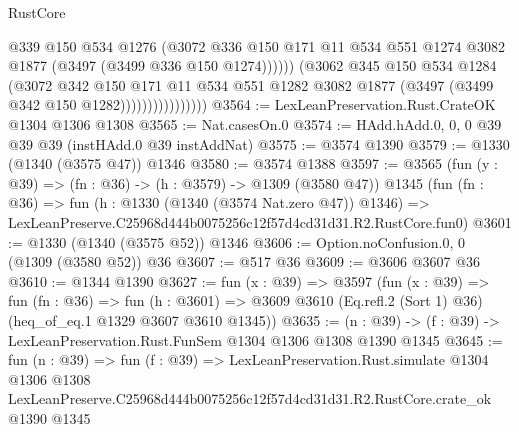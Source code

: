 \begin{lexlean}{RustCore}
\begin{coremodule}
                                  @339
                                  @150
                                  @534
                                  @1276
                                  (@3072
                                    @336
                                    @150
                                    @171
                                    @11
                                    @534
                                    @551
                                    @1274
                                    @3082
                                    @1877
                                    (@3497 (@3499 @336 @150 @1274))))))
                            (@3062
                              @345
                              @150
                              @534
                              @1284
                              (@3072
                                @342
                                @150
                                @171
                                @11
                                @534
                                @551
                                @1282
                                @3082
                                @1877
                                (@3497 (@3499 @342 @150 @1282))))))))))))))))
@3564 := LexLeanPreservation.Rust.CrateOK @1304 @1306 @1308
@3565 := Nat.casesOn.{0}
@3574 := HAdd.hAdd.{0, 0, 0} @39 @39 @39 (instHAdd.{0} @39 instAddNat)
@3575 := @3574 @1390
@3579 := @1330 (@1340 (@3575 @47)) @1346
@3580 := @3574 @1388
@3597 := @3565
    (fun (y : @39) => (fn : @36) -> (h : @3579) -> @1309 (@3580 @47))
    @1345
    (fun (fn : @36) =>
    fun (h : @1330 (@1340 (@3574 Nat.zero @47)) @1346) =>
    LexLeanPreserve.C25968d444b0075256c12f57d4cd31d31.R2.RustCore.fun0)
@3601 := @1330 (@1340 (@3575 @52)) @1346
@3606 := Option.noConfusion.{0, 0} (@1309 (@3580 @52)) @36
@3607 := @517 @36
@3609 := @3606 @3607 @36
@3610 := @1344 @1390
@3627 := fun (x : @39) =>
  @3597
    (fun (x : @39) =>
    fun (fn : @36) =>
    fun (h : @3601) =>
    @3609 @3610 (Eq.refl.{2} (Sort 1) @36) (heq_of_eq.{1} @1329 @3607 @3610 @1345))
@3635 := (n : @39) -> (f : @39) -> LexLeanPreservation.Rust.FunSem @1304 @1306 @1308 @1390 @1345
@3645 := fun (n : @39) =>
  fun (f : @39) =>
  LexLeanPreservation.Rust.simulate
    @1304
    @1306
    @1308
    LexLeanPreserve.C25968d444b0075256c12f57d4cd31d31.R2.RustCore.crate_ok
    @1390
    @1345
\end{coremodule}
\end{lexlean}
